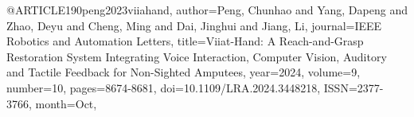 @ARTICLE{190peng2023viiahand,
author={Peng, Chunhao and Yang, Dapeng and Zhao, Deyu and Cheng, Ming and Dai, Jinghui and Jiang, Li},
journal={IEEE Robotics and Automation Letters}, 
title={Viiat-Hand: A Reach-and-Grasp Restoration System Integrating Voice Interaction, Computer Vision, Auditory and Tactile Feedback for Non-Sighted Amputees}, 
year={2024},
volume={9},
number={10},
pages={8674-8681},
doi={10.1109/LRA.2024.3448218},
ISSN={2377-3766},
month={Oct},}